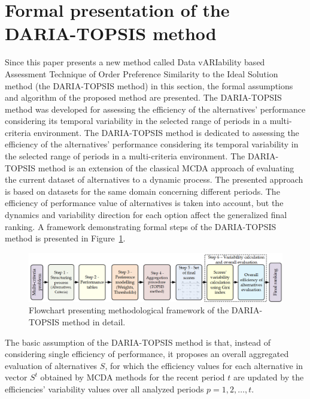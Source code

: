 \documentclass[final,5p,times,twocolumn,authoryear]{elsarticle}
\begin{document}
\section{Formal presentation of the DARIA-TOPSIS method}
\label{sec:methodology}
Since this paper presents a new method called Data vARIability based Assessment Technique of Order Preference Similarity to the Ideal Solution method (the DARIA-TOPSIS method) in this section, the formal assumptions and algorithm of the proposed method are presented. The DARIA-TOPSIS method was developed for assessing the efficiency of the alternatives' performance considering its temporal variability in the selected range of periods in a multi-criteria environment. The DARIA-TOPSIS method is dedicated to assessing the efficiency of the alternatives' performance considering its temporal variability in the selected range of periods in a multi-criteria environment. The DARIA-TOPSIS method is an extension of the classical MCDA approach of evaluating the current dataset of alternatives to a dynamic process. The presented approach is based on datasets for the same domain concerning different periods. The efficiency of performance value of alternatives is taken into account, but the dynamics and variability direction for each option affect the generalized final ranking. A framework demonstrating formal steps of the DARIA-TOPSIS method is presented in Figure~\ref{fig:methodologicalFramework}.

\begin{figure}[ht!]
    \centering
    \includegraphics[width=\linewidth]{SCSfram_methodology.png}
    \caption{Flowchart presenting methodological framework of the DARIA-TOPSIS method in detail.}
    \label{fig:methodologicalFramework}
\end{figure}

The basic assumption of the DARIA-TOPSIS method is that, instead of considering single efficiency of performance, it proposes an overall aggregated evaluation of alternatives $S$, for which the efficiency values for each alternative in vector $S^{t}$ obtained by MCDA methods for the recent period $t$ are updated by the efficiencies' variability values over all analyzed periods $p = 1, 2, \ldots, t$.
\end{document}
